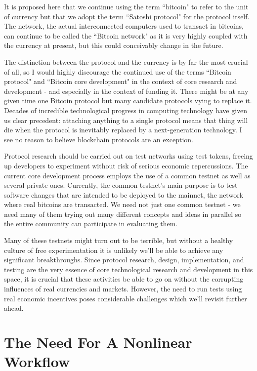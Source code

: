 \documentclass{article}
\begin{document}
It is proposed here that we continue using the term ``bitcoin" to refer to the unit of currency but that we adopt the term ``Satoshi protocol" for the protocol itself. The network, the actual interconnected computers used to transact in bitcoins, can continue to be called the ``Bitcoin network" as it is very highly coupled with the currency at present, but this could conceivably change in the future.

The distinction between the protocol and the currency is by far the most crucial of all, so I would highly discourage the continued use of the terms ``Bitcoin protocol" and ``Bitcoin core development" in the context of core research and development - and especially in the context of funding it. There might be at any given time one Bitcoin protocol but many candidate protocols vying to replace it. Decades of incredible technological progress in computing technology have given us clear precedent: attaching anything to a single protocol means that thing will die when the protocol is inevitably replaced by a next-generation technology. I see no reason to believe blockchain protocols are an exception.

Protocol research should be carried out on test networks using test tokens, freeing up developers to experiment without risk of serious economic repercussions. The current core development process employs the use of a common testnet as well as several private ones. Currently, the common testnet's main purpose is to test software changes that are intended to be deployed to the mainnet, the network where real bitcoins are transacted. We need not just one common testnet - we need many of them trying out many different concepts and ideas in parallel so the entire community can participate in evaluating them. 

Many of these testnets might turn out to be terrible, but without a healthy culture of free experimentation it is unlikely we'll be able to achieve any significant breakthroughs. Since protocol research, design, implementation, and testing are the very essence of core technological research and development in this space, it is crucial that these activities be able to go on without the corrupting influences of real currencies and markets. However, the need to run tests using real economic incentives poses considerable challenges which we'll revisit further ahead.

\pagebreak

\section{The Need For A Nonlinear Workflow}
\end{document}
